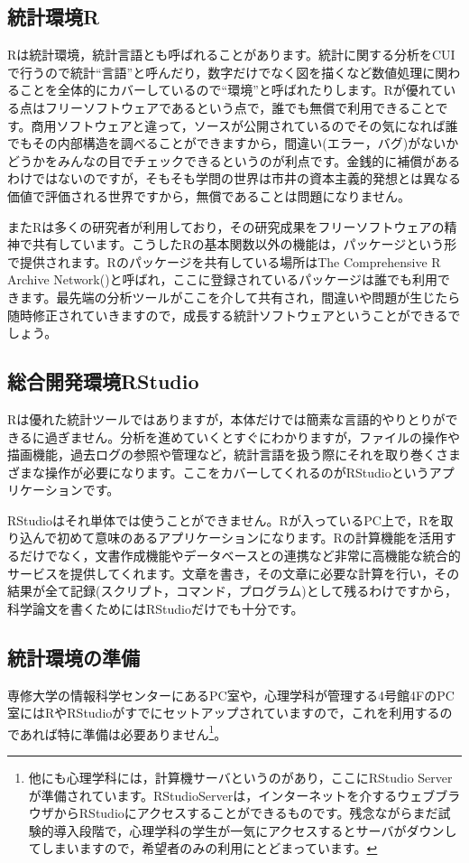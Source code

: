 \documentclass{ltjbook}
\begin{document}
\subsection{統計環境R}
Rは統計環境，統計言語とも呼ばれることがあります。統計に関する分析をCUIで行うので統計``言語''と呼んだり，数字だけでなく図を描くなど数値処理に関わることを全体的にカバーしているので``環境''と呼ばれたりします。Rが優れている点はフリーソフトウェアであるという点で，誰でも無償で利用できることです。商用ソフトウェアと違って，ソースが公開されているのでその気になれば誰でもその内部構造を調べることができますから，間違い(エラー，バグ)がないかどうかをみんなの目でチェックできるというのが利点です。金銭的に補償があるわけではないのですが，そもそも学問の世界は市井の資本主義的発想とは異なる価値で評価される世界ですから，無償であることは問題になりません。

またRは多くの研究者が利用しており，その研究成果をフリーソフトウェアの精神で共有しています。こうしたRの基本関数以外の機能は，パッケージという形で提供されます。Rのパッケージを共有している場所はThe Comprehensive R Archive Network()と呼ばれ，ここに登録されているパッケージは誰でも利用できます。最先端の分析ツールがここを介して共有され，間違いや問題が生じたら随時修正されていきますので，成長する統計ソフトウェアということができるでしょう。

\subsection{総合開発環境RStudio}
Rは優れた統計ツールではありますが，本体だけでは簡素な言語的やりとりができるに過ぎません。分析を進めていくとすぐにわかりますが，ファイルの操作や描画機能，過去ログの参照や管理など，統計言語を扱う際にそれを取り巻くさまざまな操作が必要になります。ここをカバーしてくれるのがRStudioというアプリケーションです。

RStudioはそれ単体では使うことができません。Rが入っているPC上で，Rを取り込んで初めて意味のあるアプリケーションになります。Rの計算機能を活用するだけでなく，文書作成機能やデータベースとの連携など非常に高機能な統合的サービスを提供してくれます。文章を書き，その文章に必要な計算を行い，その結果が全て記録(スクリプト，コマンド，プログラム)として残るわけですから，科学論文を書くためにはRStudioだけでも十分です。

\subsection{統計環境の準備}
専修大学の情報科学センターにあるPC室や，心理学科が管理する4号館4FのPC室にはRやRStudioがすでにセットアップされていますので，これを利用するのであれば特に準備は必要ありません\footnote{他にも心理学科には，計算機サーバというのがあり，ここにRStudio Serverが準備されています。RStudioServerは，インターネットを介するウェブブラウザからRStudioにアクセスすることができるものです。残念ながらまだ試験的導入段階で，心理学科の学生が一気にアクセスするとサーバがダウンしてしまいますので，希望者のみの利用にとどまっています。}。
\end{document}
